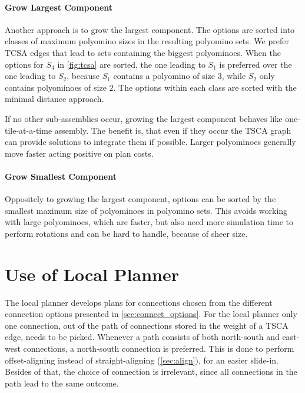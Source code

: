 \paragraph{Grow Largest Component}

Another approach is to grow the largest component.
The options are sorted into classes of maximum polyomino sizes in the resulting polyomino sets.
We prefer TCSA edges that lead to sets containing the biggest polyominoes.
When the options for $S_4$ in \autoref{fig:tcsa} are sorted, the one leading to $S_1$ is preferred over the one leading to $S_2$, because $S_1$ contains a polyomino of size $3$, while $S_2$ only contains polyominoes of size $2$. 
The options within each class are sorted with the minimal distance approach.

If no other sub-assemblies occur, growing the largest component behaves like one-tile-at-a-time assembly.
The benefit is, that even if they occur the TSCA graph can provide solutions to integrate them if possible.
Larger polyominoes generally move faster acting positive on plan costs.

\paragraph{Grow Smallest Component}

Oppositely to growing the largest component, options can be sorted by the smallest maximum size of polyominoes in polyomino sets.
This avoids working with large polyominoes, which are faster, but also need more simulation time to perform rotations and can be hard to handle, because of sheer size.


\section{Use of Local Planner}
\label{sec:local_in_global}

The local planner develops plans for connections chosen from the different connection options presented in \autoref{sec:connect_options}.
For the local planner only one connection, out of the path of connections stored in the weight of a TSCA edge, needs to be picked.
Whenever a path consists of both north-south and east-west connections, a north-south connection is preferred.
This is done to perform offset-aligning instead of straight-aligning (\autoref{sec:align}), for an easier slide-in.
Besides of that, the choice of connection is irrelevant, since all connections in the path lead to the same outcome.

